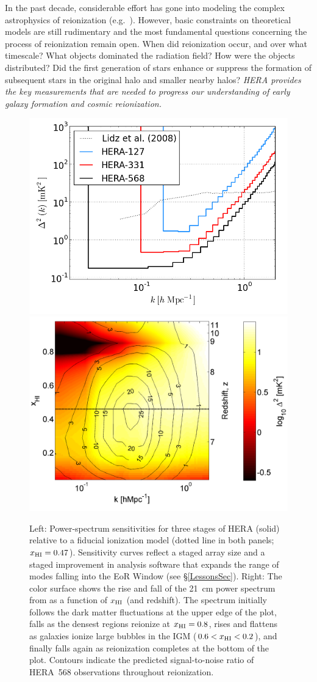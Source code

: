 \documentclass[preprint]{aastex}
\def\HI{{H{\small I }}}
\def\xHI{{x_{\rm\HI}}}
\begin{document}
In the past decade, considerable effort has gone into modeling the complex astrophysics
of reionization (e.g.\ \citealt{santos_et_al2010,mesinger_et_al2011,wyithe_loeb2004}). However,
basic constraints on theoretical models are still rudimentary and the most
fundamental questions concerning the process of reionization remain open.
When did
reionization occur, and over what timescale?  What objects dominated the
radiation field? How were the objects distributed? Did the first generation of
stars enhance or suppress the formation of subsequent stars in the original
halo and smaller nearby halos? {\it HERA provides the key measurements 
that are needed to progress our understanding of early galaxy formation and
cosmic reionization.}

\begin{figure}[t]\centering
\includegraphics[height=2.40 in]{plots/eor_pspec.png}
\includegraphics[height=2.45 in]{plots/hera_snr_contour.png} 
\caption{\small 
Left: Power-spectrum sensitivities for three stages of
HERA (solid) relative to a fiducial ionization model (dotted line in both panels; $\xHI=0.47$).  
Sensitivity curves reflect a staged array size and
a staged improvement in analysis software that expands the range
of modes falling into the EoR Window (see \S\ref{LessonsSec}).
Right: The color surface shows the rise and fall of the 21~cm power spectrum from 
\citealt{lidz_et_al2008} as a function of $\xHI$ (and redshift).
The spectrum initially follows the dark matter fluctuations at the upper edge
of the plot, falls as the densest regions reionize at $\xHI=0.8$, rises and flattens as galaxies ionize large bubbles in the IGM
($0.6<\xHI<0.2$), and finally
falls again as reionization completes at the bottom of the
plot. Contours indicate the predicted signal-to-noise ratio of HERA~568 observations
throughout reionization.
}\label{fig:eor_pspec} 
\end{figure}
\end{document}
